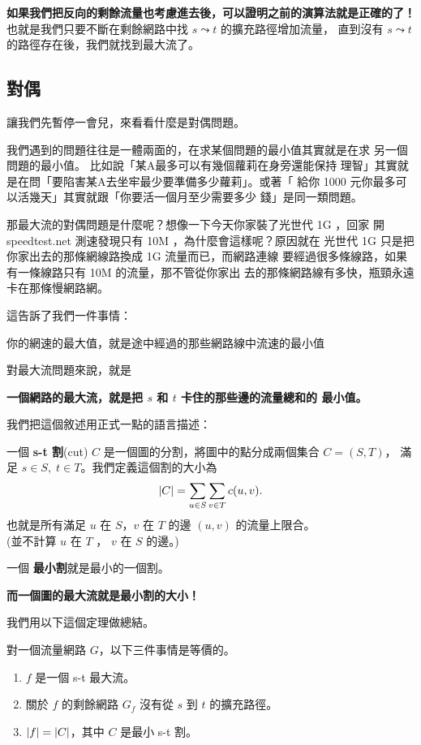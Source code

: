 \documentclass[a4paper,12pt]{book}
\begin{document}
{\bf 如果我們把反向的剩餘流量也考慮進去後，可以證明之前的演算法就是正確的了！}
也就是我們只要不斷在剩餘網路中找 $s \leadsto t$ 的擴充路徑增加流量，
直到沒有 $s \leadsto t$ 的路徑存在後，我們就找到最大流了。

\subsection{對偶}
讓我們先暫停一會兒，來看看什麼是對偶問題。

我們遇到的問題往往是一體兩面的，在求某個問題的最小值其實就是在求
另一個問題的最小值。 比如說「某A最多可以有幾個蘿莉在身旁還能保持
理智」其實就是在問「要陷害某A去坐牢最少要準備多少蘿莉」。或著「
給你 1000 元你最多可以活幾天」其實就跟「你要活一個月至少需要多少
錢」是同一類問題。

那最大流的對偶問題是什麼呢？想像一下今天你家裝了光世代 1G ，回家
開 speedtest.net 測速發現只有 10M ，為什麼會這樣呢？原因就在
光世代 1G 只是把你家出去的那條網線路換成 1G 流量而已，而網路連線
要經過很多條線路，如果有一條線路只有 10M 的流量，那不管從你家出
去的那條網路線有多快，瓶頸永遠卡在那條慢網路網。

這告訴了我們一件事情：
\begin{displayquote}
  你的網速的最大值，就是途中經過的那些網路線中流速的最小值
\end{displayquote}
對最大流問題來說，就是
\begin{displayquote}
  {\bf 一個網路的最大流，就是把 $s$ 和 $t$ 卡住的那些邊的流量總和的
  最小值。}
\end{displayquote}
我們把這個敘述用正式一點的語言描述：
\begin{theorem}[定義]
  一個 {\bf s-t 割}(cut) $C$ 是一個圖的分割，將圖中的點分成兩個集合 $C = (S, T)$，
  滿足 $s \in S, \; t \in T$。我們定義這個割的大小為
  \[ \lvert C \rvert = \sum_{u \in S} \sum_{v \in T} c(u, v). \]
  也就是所有滿足 $u$ 在 $S$，$v$ 在 $T$ 的邊 $(u, v)$ 的流量上限合。\\
  (並不計算 $u$ 在 $T$ ， $v$ 在 $S$ 的邊。)

  一個 {\bf 最小割}就是最小的一個割。
\end{theorem}
{\bf 而一個圖的最大流就是最小割的大小！}
\begin{figure}[H]
  \centering
  
\end{figure}

我們用以下這個定理做總結。

\begin{theorem}
  對一個流量網路 $G$，以下三件事情是等價的。
  \begin{enumerate}
    \item $f$ 是一個 s-t 最大流。
    \item 關於 $f$ 的剩餘網路 $G_f$ 沒有從 $s$ 到 $t$ 的擴充路徑。
    \item $\lvert f \rvert = \lvert C \rvert$，其中 $C$ 是最小 s-t 割。
  \end{enumerate}
\end{theorem}
\end{document}
